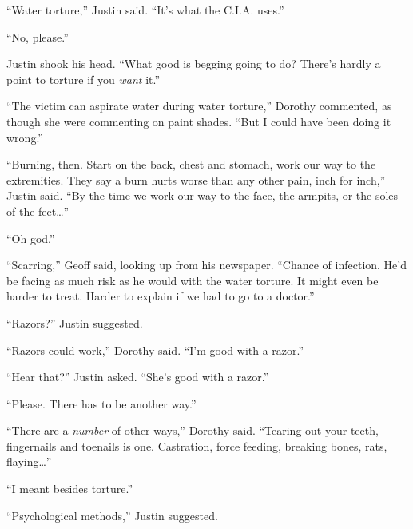 





``Water torture,'' Justin said.  ``It's what the C.I.A. uses.''



``No, please.''



Justin shook his head.  ``What good is begging going to do?  There's hardly a point to torture if you \emph{want} it.''



``The victim can aspirate water during water torture,'' Dorothy commented, as though she were commenting on paint shades.  ``But I could have been doing it wrong.''



``Burning, then.  Start on the back, chest and stomach, work our way to the extremities.  They say a burn hurts worse than any other pain, inch for inch,'' Justin said.  ``By the time we work our way to the face, the armpits, or the soles of the feet\ldots''



``Oh god.''



``Scarring,'' Geoff said, looking up from his newspaper.  ``Chance of infection.  He'd be facing as much risk as he would with the water torture.  It might even be harder to treat.  Harder to explain if we had to go to a doctor.''



``Razors?''  Justin suggested.



``Razors could work,'' Dorothy said.  ``I'm good with a razor.''



``Hear that?'' Justin asked.  ``She's good with a razor.''



``Please.  There has to be another way.''



``There are a \emph{number} of other ways,'' Dorothy said.  ``Tearing out your teeth, fingernails and toenails is one.  Castration, force feeding, breaking bones, rats, flaying\ldots''



``I meant besides torture.''



``Psychological methods,'' Justin suggested.



